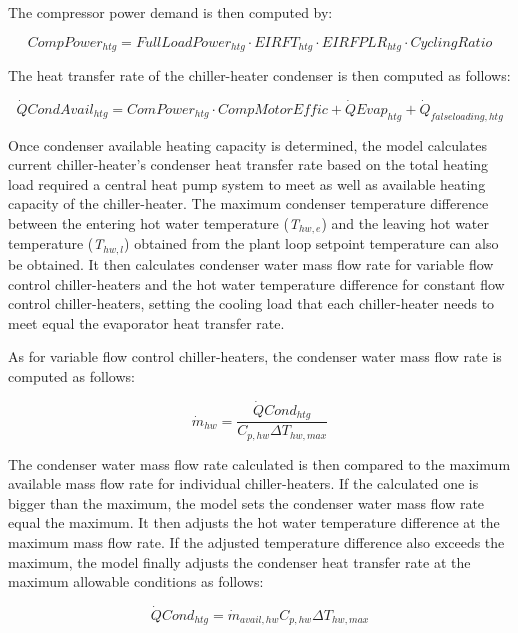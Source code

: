 The compressor power demand is then computed by:

\begin{equation}
CompPowe{r_{htg}} = FullLoadPowe{r_{htg}} \cdot EIRF{T_{htg}} \cdot EIRFPL{R_{htg}} \cdot CyclingRatio
\end{equation}

The heat transfer rate of the chiller-heater condenser is then computed as follows:

\begin{equation}
\dot QCondAvai{l_{htg}} = ComPowe{r_{htg}} \cdot CompMotorEffic + \dot QEva{p_{htg}} + {\dot Q_{falseloading,htg}}
\end{equation}

Once condenser available heating capacity is determined, the model calculates current chiller-heater's condenser heat transfer rate based on the total heating load required a central heat pump system to meet as well as available heating capacity of the chiller-heater. The maximum condenser temperature difference between the entering hot water temperature (\emph{T\(_{hw,e}\)}) and the leaving hot water temperature (\emph{T\(_{hw,l}\)}) obtained from the plant loop setpoint temperature can also be obtained. It then calculates condenser water mass flow rate for variable flow control chiller-heaters and the hot water temperature difference for constant flow control chiller-heaters, setting the cooling load that each chiller-heater needs to meet equal the evaporator heat transfer rate.

As for variable flow control chiller-heaters, the condenser water mass flow rate is computed as follows:

\begin{equation}
{\dot m_{hw}} = \frac{{\dot QCon{d_{htg}}}}{{{C_{p,hw}}\Delta {T_{hw,max}}}}
\end{equation}

The condenser water mass flow rate calculated is then compared to the maximum available mass flow rate for individual chiller-heaters. If the calculated one is bigger than the maximum, the model sets the condenser water mass flow rate equal the maximum. It then adjusts the hot water temperature difference at the maximum mass flow rate. If the adjusted temperature difference also exceeds the maximum, the model finally adjusts the condenser heat transfer rate at the maximum allowable conditions as follows:

\begin{equation}
\dot QCon{d_{htg}} = {\dot m_{avail,hw}}{C_{p,hw}}\Delta {T_{hw,max}}
\end{equation}

